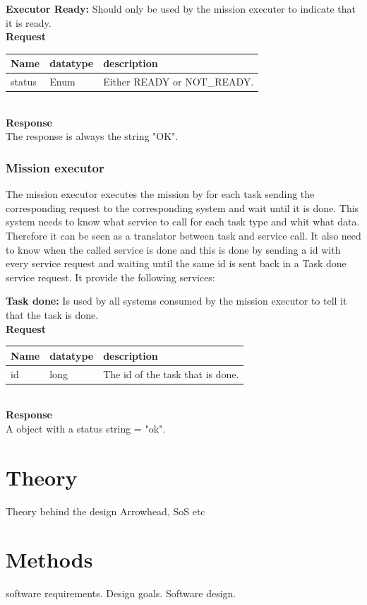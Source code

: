 \documentclass[main.tex]{subfiles}
\begin{document}
\textbf{Executor Ready:}
Should only be used by the mission executer to indicate that it is ready. \\
\textbf{Request}\\
\begin{tabular}{|l|l|l|}
    \hline
    Name & datatype & description \\
    \hline
    \hline
    status & Enum & Either READY or NOT\_READY. \\
    \hline
\end{tabular} \\
\textbf{Response}\\
The response is always the string "OK".



\subsubsection{Mission executor}
\label{sec:mission_executor}

The mission executor executes the mission by for each task sending the corresponding request to the corresponding system and wait until it is done.
This system needs to know what service to call for each task type and whit what data. Therefore it can be seen as a translator between task and service call. It also need to know when the called service is done and this is done by sending a id with every service request and waiting until the same id is sent back in a Task done service request.
It provide the following services:

\textbf{Task done:}
Is used by all systems consumed by the mission executor to tell it that the task is done.\\
\textbf{Request}\\
\begin{tabular}{|l|l|l|}
    \hline
    Name & datatype & description \\
    \hline
    \hline
    id & long & The id of the task that is done. \\
    \hline
\end{tabular} \\
\textbf{Response}\\
A object with a status string = "ok".


\section{Theory}
Theory behind the design Arrowhead, SoS etc

\section{Methods}
software requirements.
Design goals.
Software design.
\end{document}

